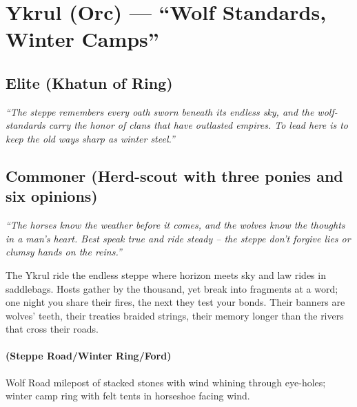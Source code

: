 \section{Ykrul (Orc) --- ``Wolf Standards, Winter Camps''}
\label{chap:ykrul}

\subsection*{Elite (Khatun of Ring)}
\textit{``The steppe remembers every oath sworn beneath its endless sky, and the wolf-standards carry the honor of clans that have outlasted empires. To lead here is to keep the old ways sharp as winter steel.''}

\subsection*{Commoner (Herd-scout with three ponies and six opinions)}
\textit{``The horses know the weather before it comes, and the wolves know the thoughts in a man's heart. Best speak true and ride steady – the steppe don't forgive lies or clumsy hands on the reins.''}

\begin{tcolorbox}[colback=black!3,colframe=black!40!white,title={Theme \& Atmosphere}]
The Ykrul ride the endless steppe where horizon meets sky and law rides in saddlebags. Hosts gather by the thousand, yet break into fragments at a word; one night you share their fires, the next they test your bonds. Their banners are wolves' teeth, their treaties braided strings, their memory longer than the rivers that cross their roads.
\end{tcolorbox}

\paragraph*{(Steppe Road/Winter Ring/Ford)} Wolf Road milepost of stacked stones with wind whining through eye-holes; winter camp ring with felt tents in horseshoe facing wind.

